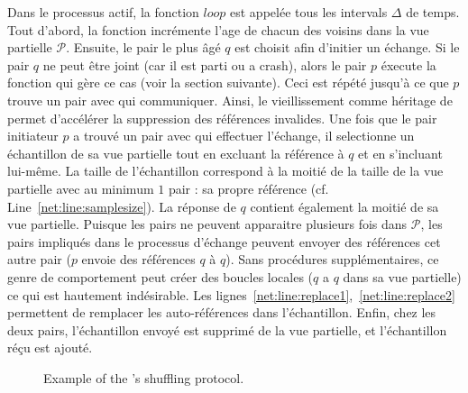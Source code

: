 Dans le processus actif, la fonction $loop$ est appelée tous les intervals
$\Delta$ de temps. Tout d'abord, la fonction incrémente l'age de chacun des
voisins dans la vue partielle $\mathcal{P}$. Ensuite, le pair le plus âgé $q$
est choisit afin d'initier un échange. Si le pair $q$ ne peut être joint (car il
est parti ou a crash), alors le pair $p$ éxecute la fonction qui gère ce cas
(voir la section suivante). Ceci est répété jusqu'à ce que $p$ trouve un pair
avec qui communiquer. Ainsi, le vieillissement comme héritage de \CYCLON permet
d'accélérer la suppression des références invalides. Une fois que le pair
initiateur $p$ a trouvé un pair avec qui effectuer l'échange, il selectionne un
échantillon de sa vue partielle tout en excluant la référence à $q$ et en
s'incluant lui-même. La taille de l'échantillon correspond à la moitié de la
taille de la vue partielle avec au minimum $1$ pair : sa propre référence
(cf. Line~\ref{net:line:samplesize}). La réponse de $q$ contient également la moitié
de sa vue partielle. Puisque les pairs ne peuvent apparaitre plusieurs fois dans
$\mathcal{P}$, les pairs impliqués dans le processus d'échange peuvent envoyer
des références cet autre pair ($p$ envoie des références $q$ à $q$). Sans
procédures supplémentaires, ce genre de comportement peut créer des boucles
locales ($q$ a $q$ dans sa vue partielle) ce qui est hautement indésirable. Les
lignes~\ref{net:line:replace1},~\ref{net:line:replace2} permettent de remplacer les
auto-références dans l'échantillon. Enfin, chez les deux pairs, l'échantillon envoyé 
est supprimé de la vue partielle, et l'échantillon réçu est ajouté.

\begin{figure*}
  \centering
  \hspace{40pt}
  \hspace{10pt}
  \caption{\label{net:fig:cyclicexample}Example of the \SPRAY's shuffling
    protocol. }
\end{figure*}

